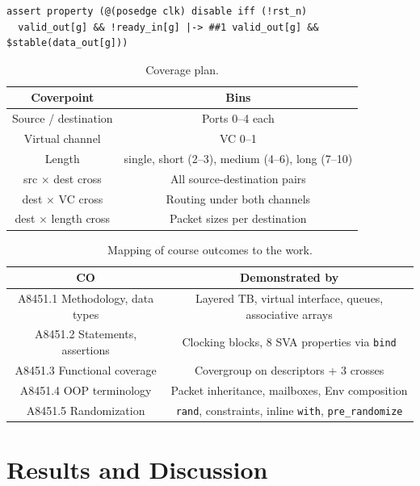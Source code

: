 \documentclass[11pt,a4paper]{report}  %
\begin{document}
\begin{verbatim}
assert property (@(posedge clk) disable iff (!rst_n)
  valid_out[g] && !ready_in[g] |-> ##1 valid_out[g] && $stable(data_out[g]))
\end{verbatim}

\begin{table}[h!]
\centering
\caption{Coverage plan.}
\vspace{2mm}
\begin{tabular}{|c|c|}
\hline
\textbf{Coverpoint} & \textbf{Bins} \\ \hline
Source / destination & Ports 0--4 each \\ \hline
Virtual channel & VC 0--1 \\ \hline
Length & single, short (2--3), medium (4--6), long (7--10) \\ \hline
src $\times$ dest cross & All source-destination pairs \\ \hline
dest $\times$ VC cross & Routing under both channels \\ \hline
dest $\times$ length cross & Packet sizes per destination \\ \hline
\end{tabular}
\label{tab:cov}
\end{table}

\begin{table}[h!]
\centering
\caption{Mapping of course outcomes to the work.}
\vspace{2mm}
\begin{tabular}{|c|c|}
\hline
\textbf{CO} & \textbf{Demonstrated by} \\ \hline
A8451.1 Methodology, data types & Layered TB, virtual interface, queues, associative arrays \\ \hline
A8451.2 Statements, assertions & Clocking blocks, 8 SVA properties via \texttt{bind} \\ \hline
A8451.3 Functional coverage & Covergroup on descriptors + 3 crosses \\ \hline
A8451.4 OOP terminology & Packet inheritance, mailboxes, Env composition \\ \hline
A8451.5 Randomization & \texttt{rand}, constraints, inline \texttt{with}, \texttt{pre\_randomize} \\ \hline
\end{tabular}
\label{tab:co}
\end{table}

\section{Results and Discussion}
\label{sec:results}
\end{document}
